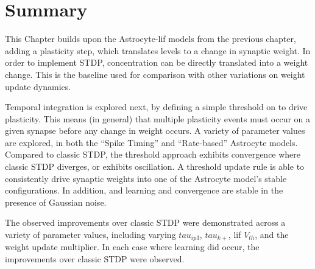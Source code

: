 
\section{Summary}

This Chapter builds upon the Astrocyte-\Gls{lif} models from the previous chapter,
adding a plasticity step, which translates \ca levels to a change
in synaptic weight. In order to implement STDP, \ca concentration can be directly
translated into a weight change. This is the baseline used for comparison with
other variations on weight update dynamics.

Temporal integration is explored next, by defining a simple threshold on
\ca to drive plasticity. This means (in general) that multiple plasticity events
must occur on a given synapse before any change in weight occurs. A variety of
parameter values are explored, in both the ``Spike Timing'' and ``Rate-based''
Astrocyte models. Compared to classic STDP, the threshold approach exhibits
convergence where classic STDP diverges, or exhibits oscillation. A threshold
update rule is able to consistently drive synaptic weights into one of the
Astrocyte model's stable configurations. In addition, and learning and
convergence are stable in the presence of Gaussian noise.

The observed improvements over classic STDP were demonstrated across a variety
of parameter values, including varying $tau_{ip3}$, $tau_{k+}$, \Gls{lif} $V_{th}$,
and the weight update multiplier. In each case where learning did occur, the
improvements over classic STDP were observed.

